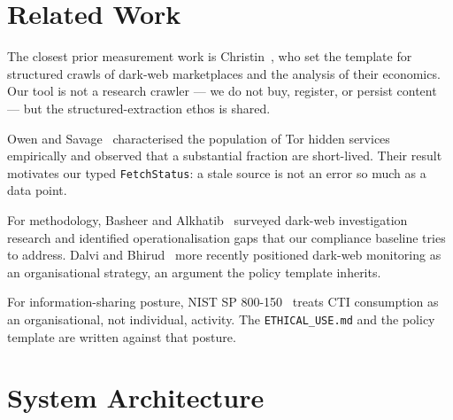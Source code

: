 \documentclass[conference]{IEEEtran}
\begin{document}
\section{Related Work}

The closest prior measurement work is
Christin~\cite{christin2013silkroad}, who set the template for
structured crawls of dark-web marketplaces and the analysis of
their economics. Our tool is not a research crawler --- we do not
buy, register, or persist content --- but the structured-extraction
ethos is shared.

Owen and Savage~\cite{owen2016tor} characterised the population of
Tor hidden services empirically and observed that a substantial
fraction are short-lived. Their result motivates our typed
\texttt{FetchStatus}: a stale source is not an error so much as a
data point.

For methodology, Basheer and Alkhatib~\cite{basheer2021review}
surveyed dark-web investigation research and identified
operationalisation gaps that our compliance baseline tries to
address. Dalvi and Bhirud~\cite{dalvi2024darkweb} more recently
positioned dark-web monitoring as an organisational strategy, an
argument the policy template inherits.

For information-sharing posture, NIST SP
800-150~\cite{nist_sp_800_150} treats CTI consumption as an
organisational, not individual, activity. The
\texttt{ETHICAL\_USE.md} and the policy template are written
against that posture.

\section{System Architecture}
\end{document}
